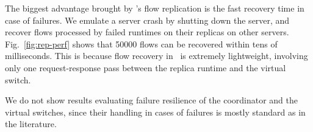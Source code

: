 The biggest advantage brought by \nfactor's flow replication is the fast recovery time in case of failures. %
We emulate a server crash by shutting down the server, and recover flows processed by failed runtimes on their replicas on other servers. Fig.~\ref{fig:rep-perf} shows that 50000 flows can be recovered within tens of milliseconds. This is because flow recovery in \nfactor~is extremely lightweight, involving only one request-response pass between the replica runtime and the virtual switch. %

We do not show results evaluating failure resilience of the coordinator and the virtual switches, since their handling in cases of failures is mostly standard as in the literature.



